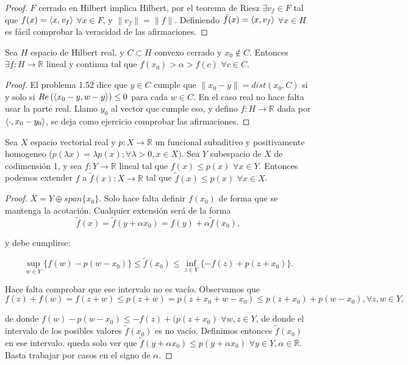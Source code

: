 \begin{proof}
  $F$ cerrado en Hilbert implica Hilbert, por el teorema de Riesz $\exists v_f
  \in F$ tal que $f(x)=\left\langle x,v_f\right\rangle$ $\forall x\in F$, y $\|v_f\|=\|f\|$.
  Definiendo $\tilde f(x)=\left\langle x,v_f\right\rangle$ $\forall x \in H$ es fácil comprobar la
  veracidad de las afirmaciones.
\end{proof}

\begin{theorem}
  Sea $H$ espacio de Hilbert real, y $C\subset H$ convexo cerrado y $x_0 \not\in C$.
  Entonces $\exists f:H\to \mathbb{R}$ lineal y continua tal que
  $f(x_0)>\alpha>f(c)$ $\forall c \in C$.
\end{theorem}

\begin{proof}
El problema 1.52 dice que $y\in C$ cumple que $\|x_0-y\|=dist(x_0,C)$ si y solo
si $Re\left( \left\langle x_0-y,w-y\right\rangle \right) \le 0$ para cada $w\in C$. En el caso
real no hace falta usar la parte real. Llamo $y_0$ al vector que cumple eso, y
defino $f:H\to \mathbb{R}$ dada por $\left\langle\cdot ,x_0-y_0\right\rangle$, se deja como
ejercicio comprobar las afirmaciones.
\end{proof}

\begin{lemma}
  Sea $X$ espacio vectorial real y $p:X\to \mathbb{R}$ un funcional subaditivo y
  positivamente homogeneo ($p(\lambda x)=\lambda p(x); \forall \lambda>0, x\in
  X)$. Sea $Y$ subespacio de $X$ de codimensión 1, y sea $f:Y\to \mathbb{R}$ 
  lineal tal que $f(x)\le p(x)$ $\forall x\in Y$. Entonces podemos extender $f$ 
  a $\tilde{f}(x):X\to \mathbb{R}$ tal que $\tilde{f}(x)\le p(x)$ $\forall x\in
  X$.
\end{lemma}

\begin{proof}
  $X=Y\oplus span \{x_0\} $. Solo hace falta definir $f(x_0)$ de forma que se
  mantenga la acotación. Cualquier extensión será de la forma
  \[
  \tilde{f}(x)=\tilde{f}(y+\alpha x_0)=f(y) + \alpha\tilde{f}(x_0)
  ,\] 

  y debe cumplirse:

  \begin{equation}
    \sup_{w\in Y} \{f(w)-p(w-x_0)\} \le \tilde{f}(x_0) \le 
    \inf_{z\in Y} \{-f(z)+p(z+x_0)\} 
  .\end{equation}

  Hace falta comprobar que ese intervalo no es vacío. Observamos que
  \[
  f(z)+f(w)=f(z+w)\le p(z+w) = p(z+x_0+w-x_0)\le p(z+x_0)+p(w-x_0), \forall
  z,w\in Y
  ,\]

  de donde $f(w)-p(w-x_0)\le -f(z)+(p(z+x_0)$ $\forall w,z\in Y$, de donde el
  intervalo de los posibles valores $\tilde{f}(x_0)$ es no vacío. Definimos
  entonces $\tilde{f}(x_0)$ en ese intervalo. queda solo ver que
  $\tilde{f}(y+\alpha x_0)\le p(y+\alpha x_0)$ $\forall y\in  Y, \alpha\in
  \mathbb{R}$. Basta trabajar por casos en el signo de $\alpha$.
\end{proof}

